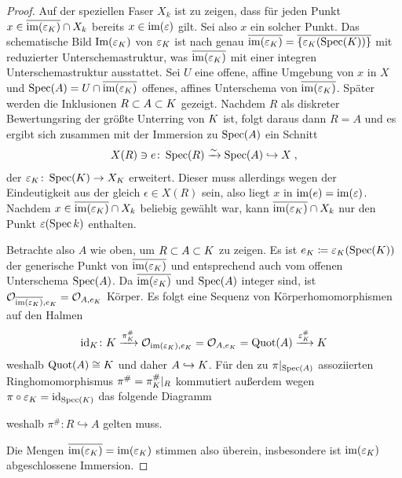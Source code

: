 \begin{Lemma}
\begin{proof}
    Auf der speziellen Faser $X_k$ ist zu zeigen, dass für jeden
    Punkt $x\in\overline{\operatorname{im}(\varepsilon_{K})}\cap X_k$ bereits
    $x\in\operatorname{im}(\varepsilon)$ gilt. Sei also $x$ ein solcher Punkt.
    Das schematische Bild $\text{Im}(\varepsilon_{K})$ von $\varepsilon_{K}$ ist
    nach \cite[Remark~10.32]{wedhorn} genau
    $\overline{\operatorname{im}(\varepsilon_{K})}=\overline{\{\varepsilon_{K}(\operatorname{Spec}(K))\}}$
    mit reduzierter Unterschemastruktur, was
    $\overline{\operatorname{im}(\varepsilon_{K})}$ mit einer integren
    Unterschemastruktur ausstattet.
    Sei $U$ eine offene, affine Umgebung von $x$ in $X$ und
    $\operatorname{Spec}(A)=U\cap\overline{\operatorname{im}(\varepsilon_{K})}$ offenes, affines
    Unterschema von $\overline{\operatorname{im}(\varepsilon_{K})}$.
    Später werden die Inklusionen $R\subset A\subset K$ gezeigt.
    Nachdem $R$ als diskreter Bewertungsring der größte Unterring
    von $K$ ist, folgt daraus dann $R=A$ und es ergibt sich zusammen
    mit der Immersion zu $\operatorname{Spec}(A)$ ein Schnitt
    \begin{gather*}
      X(R)\ni e\colon
      \operatorname{Spec}(R)\xrightarrow{\sim}\operatorname{Spec}(A)\hookrightarrow X\;,
    \end{gather*}
    der $\varepsilon_{K}\colon\operatorname{Spec}(K)\to X_{K}$ erweitert.
    Dieser muss allerdings wegen der Eindeutigkeit aus der \NAbbEig
    gleich $\epsilon\in X(R)$ sein, also liegt $x$ in
    $\operatorname{im}(e)=\operatorname{im}(\varepsilon)$.
    Nachdem $x\in \overline{\operatorname{im}(\varepsilon_{K})}\cap X_k$ beliebig
    gewählt war, kann $\overline{\operatorname{im}(\varepsilon_{K})}\cap X_k$ nur
    den Punkt $\varepsilon(\operatorname{Spec} k)$ enthalten.

    Betrachte also $A$ wie oben, um $R\subset A\subset K$ zu
    zeigen. Es ist $e_{K}\coloneqq\varepsilon_{K}(\operatorname{Spec}(K))$ der
    generische Punkt von $\overline{\operatorname{im}(\varepsilon_{K})}$ und
    entsprechend auch vom offenen Unterschema $\operatorname{Spec}(A)$. Da
    $\overline{\operatorname{im}(\varepsilon_{K})}$ und $\operatorname{Spec}(A)$ integer sind, ist
    $\mathcal{O}_{\overline{\text{im}(\varepsilon_{K})}, e_{K}}=\mathcal{O}_{A,e_{K}}$ Körper.
    Es folgt eine Sequenz von Körperhomomorphismen auf den Halmen
    \begin{gather*}
      \mathrm{id}_{K}\colon
      K \xrightarrow{\pi_{K}^\#}
      \mathcal{O}_{\text{im}(\varepsilon_{K}), e_{K}} = \mathcal{O}_{A,e_{K}} = \operatorname{Quot}(A)
      \xrightarrow{\varepsilon_{K}^\#} K
    \end{gather*}
    weshalb $\operatorname{Quot}(A)\cong K$ und daher $A\hookrightarrow K$.
    Für den zu $\pi|_{\operatorname{Spec}(A)}$ assoziierten
    Ringhomomorphismus $\pi^\#=\pi_{K}^\#|_R$ kommutiert außerdem wegen
    $\pi\circ\varepsilon_{K}=\mathrm{id}_{\operatorname{Spec}(K)}$ das folgende Diagramm
    \begin{center}
    \end{center}
    weshalb $\pi^\#\colon R\hookrightarrow A$ gelten muss.
    
    Die Mengen $\overline{\operatorname{im}(\varepsilon_{K})}=\operatorname{im}(\varepsilon_{K})$ stimmen
    also überein, insbesondere ist $\operatorname{im}(\varepsilon_{K})$ abgeschlossene
    Immersion.
  \end{proof}
\end{Lemma}

